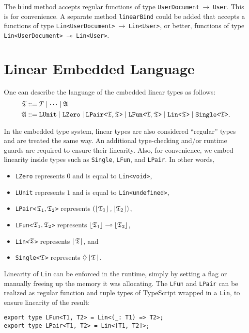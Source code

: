 The \texttt{bind} method accepts regular functions of type \texttt{UserDocument}$~\rightarrow~$\texttt{User}. This is for convenience. A separate method \texttt{linearBind} could be added that accepts a functions of type
\texttt{Lin<UserDocument>}$~\rightarrow~$\texttt{Lin<User>}, or better, functions of type \texttt{Lin<UserDocument>}$~\multimap~$\texttt{Lin<User>}.


\section{Linear Embedded Language}
One can describe the language of the embedded linear types as follows:
\begin{align*}
\mathfrak{T} &::= T \mid \cdots \mid \mathfrak{A} \\
\mathfrak{A} &::= \mathtt{LUnit} \mid \mathtt{LZero} \mid \mbox{\texttt{LPair<}}\mathfrak{T}, \mathfrak{T}\mbox{\texttt{>}} \mid \mbox{\texttt{LFun<}}\mathfrak{T}, \mathfrak{T}\mbox{\texttt{>}} \mid \mbox{\texttt{Lin<}}\mathfrak{T}\mbox{\texttt{>}} \mid \mbox{\texttt{Single<}}\mathfrak{T}\mbox{\texttt{>}}.
\end{align*}

In the embedded type system, linear types are also considered ``regular'' types and are treated the same way. An additional type-checking and/or runtime guards are required to ensure their linearity. Also, for convenience, we embed linearity inside types such as \texttt{Single}, \texttt{LFun}, and \texttt{LPair}. In other words, 
\begin{itemize}
    \item \texttt{LZero} represents $0$ and is equal to \texttt{Lin<void>},
    \item \texttt{LUnit} represents $1$ and is equal to \texttt{Lin<undefined>},
    \item \texttt{LPair<}$\mathfrak{T}_1, \mathfrak{T}_2$\texttt{>} represents $(\left\lfloor \mathfrak{T}_1 \right\rfloor, \left\lfloor \mathfrak{T}_2 \right\rfloor)$,
    \item \texttt{LFun<}$\mathfrak{T}_1, \mathfrak{T}_2$\texttt{>} represents $\left\lfloor \mathfrak{T}_1 \right\rfloor \multimap \left\lfloor \mathfrak{T}_2 \right\rfloor$,
    \item \texttt{Lin<}$\mathfrak{T}$\texttt{>} represents $\left\lfloor \mathfrak{T} \right\rfloor$, and
    \item \texttt{Single<}$\mathfrak{T}$\texttt{>} represents $\lozenge\left\lfloor \mathfrak{T} \right\rfloor$.
\end{itemize}

Linearity of \texttt{Lin} can be enforced in the runtime, simply by setting a flag or manually freeing up the memory it was allocating. The \texttt{LFun} and \texttt{LPair} can be realized as regular function and tuple types of TypeScript wrapped in a \texttt{Lin}, to ensure linearity of the result:
\begin{verbatim}
export type LFun<T1, T2> = Lin<(_: T1) => T2>;
export type LPair<T1, T2> = Lin<[T1, T2]>;
\end{verbatim}